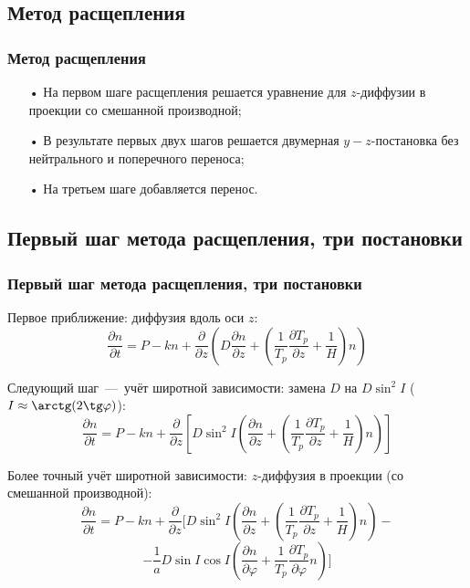 \documentclass[9pt, apectratio=43,unicode]{beamer}
\begin{document}
\subsection{Метод расщепления}
\begin{frame}\frametitle{Метод расщепления}

\begin{itemize}
\item[•] На первом шаге расщепления решается уравнение для $z$-диффузии в проекции со смешанной производной;
\item[•] В результате первых двух шагов решается двумерная $y-z$-постановка без нейтрального и поперечного переноса;
\item[•] На третьем шаге добавляется перенос.
\end{itemize}

\end{frame}


\subsection{Первый шаг метода расщепления, три постановки}
\begin{frame}\frametitle{Первый шаг метода расщепления, три постановки}

Первое приближение: диффузия вдоль оси $z$:
$$\dfrac{\partial n}{\partial t} = P-kn+\dfrac{\partial}{\partial z}\left(D\dfrac{\partial n}{\partial z} + \left(\dfrac{1}{T_p}\dfrac{\partial T_p}{\partial z}+\dfrac{1}{H}\right) n\right)$$

Следующий шаг~---~учёт широтной зависимости: замена $D$ на $D\sin^2I$ ($I \approx \arctg(2\tg \varphi)$):
$$\dfrac{\partial n}{\partial t} =P-kn+\dfrac{\partial}{\partial z}\left[D\sin^2I\left(\dfrac{\partial n}{\partial z} + \left(\dfrac{1}{T_p}\dfrac{\partial T_p}{\partial z}+\dfrac{1}{H}\right) n\right)\right]$$

Более точный учёт широтной зависимости: $z$-диффузия в проекции (со смешанной производной):
$$\dfrac{\partial n}{\partial t} =P-kn+\dfrac{\partial}{\partial z}\biggl[D\sin^2 I\left(\dfrac{\partial n}{\partial z}+\left(\dfrac{1}{T_p}\dfrac{\partial T_p}{\partial z}+\dfrac{1}{H}\right)n\right)-$$ $$-\dfrac{1}{a}D\sin I\cos I\left(\dfrac{\partial n}{\partial\varphi}+\dfrac{1}{T_p}\dfrac{\partial T_p}{\partial\varphi}n\right)\biggr]$$ 
\end{frame}
\end{document}
